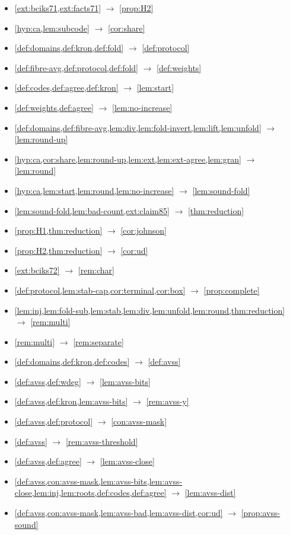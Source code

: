 \begin{itemize}
\item \cref{ext:bciks71,ext:facts71} $\to$ \cref{prop:H2}
\item \cref{hyp:ca,lem:subcode} $\to$ \cref{cor:share}
\item \cref{def:domains,def:kron,def:fold} $\to$ \cref{def:protocol}
\item \cref{def:fibre-avg,def:protocol,def:fold} $\to$ \cref{def:weights}
\item \cref{def:codes,def:agree,def:kron} $\to$ \cref{lem:start}
\item \cref{def:weights,def:agree} $\to$ \cref{lem:no-increase}
\item \cref{def:domains,def:fibre-avg,lem:div,lem:fold-invert,lem:lift,lem:unfold} $\to$ \cref{lem:round-up}
\item \cref{hyp:ca,cor:share,lem:round-up,lem:ext,lem:ext-agree,lem:gran} $\to$ \cref{lem:round}
\item \cref{hyp:ca,lem:start,lem:round,lem:no-increase} $\to$ \cref{lem:sound-fold}
\item \cref{lem:sound-fold,lem:bad-count,ext:claim85} $\to$ \cref{thm:reduction}
\item \cref{prop:H1,thm:reduction} $\to$ \cref{cor:johnson}
\item \cref{prop:H2,thm:reduction} $\to$ \cref{cor:ud}
\item \cref{ext:bciks72} $\to$ \cref{rem:char}
\item \cref{def:protocol,lem:stab-cap,cor:terminal,cor:box} $\to$ \cref{prop:complete}
\item \cref{lem:inj,lem:fold-sub,lem:stab,lem:div,lem:unfold,lem:round,thm:reduction} $\to$ \cref{rem:multi}
\item \cref{rem:multi} $\to$ \cref{rem:separate}
\item \cref{def:domains,def:kron,def:codes} $\to$ \cref{def:avss}
\item \cref{def:avss,def:wdeg} $\to$ \cref{lem:avss-bits}
\item \cref{def:avss,def:kron,lem:avss-bits} $\to$ \cref{rem:avss-y}
\item \cref{def:avss,def:protocol} $\to$ \cref{con:avss-mask}
\item \cref{def:avss} $\to$ \cref{rem:avss-threshold}
\item \cref{def:avss,def:agree} $\to$ \cref{lem:avss-close}
\item \cref{def:avss,con:avss-mask,lem:avss-bits,lem:avss-close,lem:inj,lem:roots,def:codes,def:agree} $\to$ \cref{lem:avss-dist}
\item \cref{def:avss,con:avss-mask,lem:avss-bad,lem:avss-dist,cor:ud} $\to$ \cref{prop:avss-sound}

\end{itemize}
